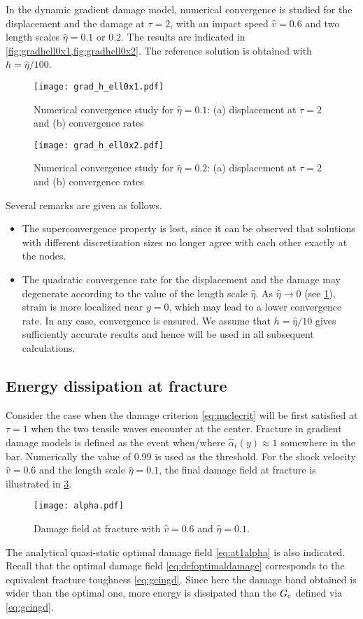 In the dynamic gradient damage model, numerical convergence is studied for the displacement and the damage at $\tau=2$, with an impact speed $\widehat{v}=0.6$ and two length scales $\widehat{\eta}=0.1$ or $0.2$. The results are indicated in \cref{fig:gradhell0x1,fig:gradhell0x2}. The reference solution is obtained with $h=\widehat{\eta}/100$.
\begin{figure}[htbp]
\texttt{[image: grad\_h\_ell0x1.pdf]}
\caption{Numerical convergence study for $\widehat{\eta}=0.1$: (a) displacement at $\tau=2$ and (b) convergence rates} \label{fig:gradhell0x1}
\end{figure}
\begin{figure}[htbp]
\texttt{[image: grad\_h\_ell0x2.pdf]}
\caption{Numerical convergence study for $\widehat{\eta}=0.2$: (a) displacement at $\tau=2$ and (b) convergence rates} \label{fig:gradhell0x2}
\end{figure}
Several remarks are given as follows.
\begin{itemize}
\item The superconvergence property is lost, since it can be observed that solutions with different discretization sizes no longer agree with each other exactly at the nodes.
\item The quadratic convergence rate for the displacement and the damage may degenerate according to the value of the length scale $\widehat{\eta}$. As $\widehat{\eta}\to 0$ (see \cref{fig:gradhell0x1}), strain is more localized near $y=0$, which may lead to a lower convergence rate. In any case, convergence is ensured. We assume that $h=\widehat{\eta}/10$ gives sufficiently accurate results and hence will be used in all subsequent calculations.
\end{itemize}

\subsection{Energy dissipation at fracture}
Consider the case when the damage criterion \eqref{eq:nuclecrit} will be first satisfied at $\tau=1$ when the two tensile waves encounter at the center. Fracture in gradient damage models is defined as the event when/where $\widehat{\alpha}_t(y)\approx 1$ somewhere in the bar. Numerically the value of 0.99 is used as the threshold. For the shock velocity $\widehat{v}=0.6$ and the length scale $\widehat{\eta}=0.1$, the final damage field at fracture is illustrated in \cref{fig:alphatf}.
\begin{figure}[htbp]
\centering
\texttt{[image: alpha.pdf]}
\caption{Damage field at fracture with $\widehat{v}=0.6$ and $\widehat{\eta}=0.1$.} \label{fig:alphatf}
\end{figure}
The analytical quasi-static optimal damage field \eqref{eq:at1alpha} is also indicated. Recall that the optimal damage field \eqref{eq:defoptimaldamage} corresponds to the equivalent fracture toughness \eqref{eq:gcingd}. Since here the damage band obtained is wider than the optimal one, more energy is dissipated than the $G_\mathrm{c}$ defined via \eqref{eq:gcingd}.

